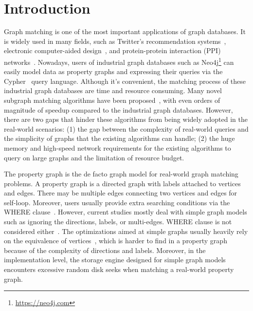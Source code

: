 \section{Introduction}
Graph matching is one of the most important applications of graph databases.
It is widely used in many fields,
such as Twitter's recommendation systems~\cite{DBLP:journals/pvldb/GuptaSGGZLL14,DBLP:journals/pvldb/SharmaJBLL16},
electronic computer-aided design~\cite{DBLP:conf/dac/OhlrichEGS93},
and protein-protein interaction (PPI) networks~\cite{milenkovic2008uncovering}.
Nowadays, users of industrial graph databases such as Neo4j\footnote{\url{https://neo4j.com}}
can easily model data as property graphs and expressing their queries via the Cypher~\cite{DBLP:conf/sigmod/FrancisGGLLMPRS18} query language.
Although it's convenient, the matching process of these industrial graph databases are time and resource consuming.
Many novel subgraph matching algorithms have been proposed~\cite{DBLP:journals/pvldb/SunWWSL12,DBLP:conf/sigmod/HanLL13,DBLP:conf/sigmod/ShaoCCMYX14,DBLP:conf/cloud/SerafiniMS17,DBLP:journals/pvldb/QiaoZC17,DBLP:conf/sigmod/DiasTGM019}, with even orders of magnitude of speedup compared to the industrial graph databases.
However, there are two gaps that hinder these algorithms from being widely adopted in the real-world scenarios:
(1) the gap between the complexity of real-world queries and the simplicity of graphs that the existing algorithms can handle;
(2) the huge memory and high-speed network requirements for the existing algorithms to query on large graphs and the limitation of resource budget.

The property graph is the de facto graph model for real-world graph matching problems.
A property graph is a directed graph with labels attached to vertices and edges.
There may be multiple edges connecting two vertices and edges for self-loop.
Moreover, users usually provide extra searching conditions via the WHERE clause~\cite{DBLP:journals/csur/AnglesABHRV17}. However,  current studies mostly deal with simple graph models such as ignoring the directions, labels, or multi-edges. WHERE clause is not considered either~\cite{DBLP:journals/pvldb/SunWWSL12,DBLP:conf/sigmod/HanLL13,DBLP:conf/sigmod/KimLBHLKJ16,DBLP:journals/pvldb/QiaoZC17,DBLP:journals/pvldb/MhedhbiS19}. The optimizations aimed at simple graphs usually heavily rely on the equivalence of vertices~\cite{DBLP:conf/sigmod/HanLL13,DBLP:journals/pvldb/QiaoZC17}, which is harder to find in a property graph because of the complexity of directions and labels. Moreover, in the implementation level, the storage engine designed for simple graph models encounters excessive random disk seeks when matching a real-world property graph.

